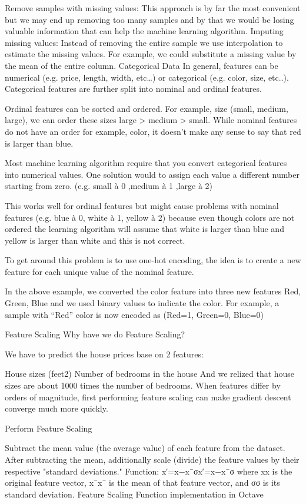 Remove samples with missing values: This approach is by far the most convenient but we may end up removing too many samples and by that we would be losing valuable information that can help the machine learning algorithm.
Imputing missing values: Instead of removing the entire sample we use interpolation to estimate the missing values. For example, we could substitute a missing value by the mean of the entire column.
Categorical Data
In general, features can be numerical (e.g. price, length, width, etc…) or categorical (e.g. color, size, etc..). Categorical features are further split into nominal and ordinal features.

Ordinal features can be sorted and ordered. For example, size (small, medium, large), we can order these sizes large > medium > small. While nominal features do not have an order for example, color, it doesn’t make any sense to say that red is larger than blue.

Most machine learning algorithm require that you convert categorical features into numerical values. One solution would to assign each value a different number starting from zero. (e.g. small à 0 ,medium à 1 ,large à 2)

This works well for ordinal features but might cause problems with nominal features (e.g. blue à 0, white à 1, yellow à 2) because even though colors are not ordered the learning algorithm will assume that white is larger than blue and yellow is larger than white and this is not correct.

To get around this problem is to use one-hot encoding, the idea is to create a new feature for each unique value of the nominal feature.


In the above example, we converted the color feature into three new features Red, Green, Blue and we used binary values to indicate the color. For example, a sample with “Red” color is now encoded as (Red=1, Green=0, Blue=0)

Feature Scaling
Why have we do Feature Scaling?

We have to predict the house prices base on 2 features:

House sizes (feet2)
Number of bedrooms in the house
And we relized that house sizes are about 1000 times the number of bedrooms. When features differ by orders of magnitude, first performing feature scaling can make gradient descent converge much more quickly.

Perform Feature Scaling

Subtract the mean value (the average value) of each feature from the dataset.
After subtracting the mean, additionally scale (divide) the feature values by their respective "standard deviations."
Function: x′=x−x¯σx′=x−x¯σ where xx is the original feature vector, x¯x¯ is the mean of that feature vector, and σσ is its standard deviation.
Feature Scaling Function implementation in Octave


